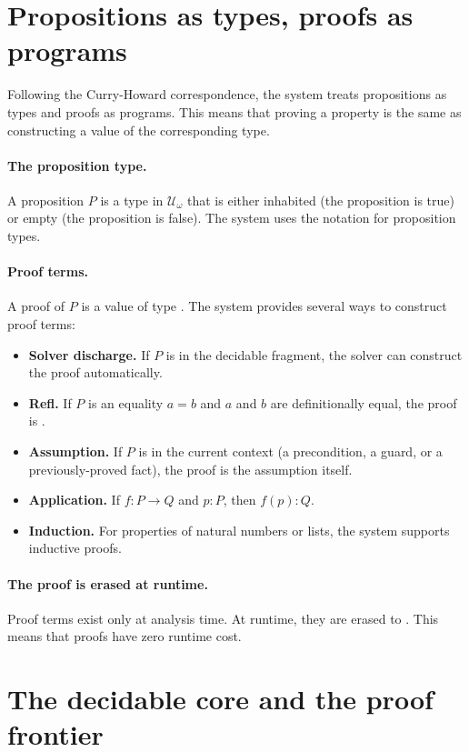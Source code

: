 \documentclass[11pt]{report}
\DeclareRobustCommand{\py}[1]{\texttt{\detokenize{#1}}}
\theoremstyle{definition}
\theoremstyle{plain}
\begin{document}
\section{Propositions as types, proofs as programs}

Following the Curry-Howard correspondence, the system treats propositions as
types and proofs as programs. This means that proving a property is the same
as constructing a value of the corresponding type.

\paragraph{The proposition type.}
A proposition $P$ is a type in $\mathcal{U}_\omega$ that is either inhabited
(the proposition is true) or empty (the proposition is false). The system
uses the notation \py{Prop[P]} for proposition types.

\paragraph{Proof terms.}
A proof of $P$ is a value of type \py{Prop[P]}. The system provides several
ways to construct proof terms:
\begin{itemize}[nosep]
  \item \textbf{Solver discharge.} If $P$ is in the decidable fragment, the
        solver can construct the proof automatically.
  \item \textbf{Refl.} If $P$ is an equality $a = b$ and $a$ and $b$ are
        definitionally equal, the proof is \py{refl}.
  \item \textbf{Assumption.} If $P$ is in the current context (a precondition,
        a guard, or a previously-proved fact), the proof is the assumption
        itself.
  \item \textbf{Application.} If $f : P \to Q$ and $p : P$, then $f(p) : Q$.
  \item \textbf{Induction.} For properties of natural numbers or lists, the
        system supports inductive proofs.
\end{itemize}

\paragraph{The proof is erased at runtime.}
Proof terms exist only at analysis time. At runtime, they are erased to
\py{None}. This means that proofs have zero runtime cost.

\section{The decidable core and the proof frontier}
\end{document}
